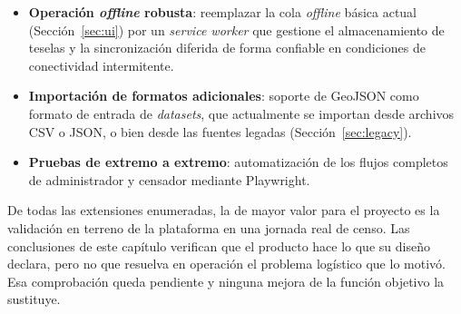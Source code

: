 \begin{itemize}
  \item \textbf{Operación \textit{offline} robusta}: reemplazar la cola
  \textit{offline} básica actual (Sección~\ref{sec:ui}) por un \textit{service
  worker} que gestione el almacenamiento de teselas y la sincronización diferida
  de forma confiable en condiciones de conectividad intermitente.

  \item \textbf{Importación de formatos adicionales}: soporte de GeoJSON como
  formato de entrada de \textit{datasets}, que actualmente se importan desde
  archivos CSV o JSON, o bien desde las fuentes legadas
  (Sección~\ref{sec:legacy}).

  \item \textbf{Pruebas de extremo a extremo}: automatización de los flujos
  completos de administrador y censador mediante Playwright.
\end{itemize}

De todas las extensiones enumeradas, la de mayor valor para el proyecto es la
validación en terreno de la plataforma en una jornada real de censo. Las
conclusiones de este capítulo verifican que el producto hace lo que su diseño
declara, pero no que resuelva en operación el problema logístico que lo motivó.
Esa comprobación queda pendiente y ninguna mejora de la función objetivo la
sustituye.
